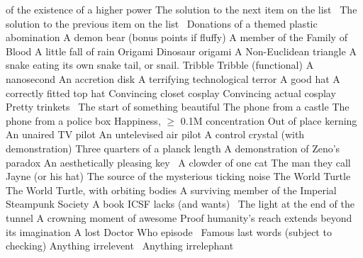 \begin{multicols}{2}
\begin{small}
\begin{tabbing}
{        of the existence of a higher power}
           {The solution to the next item on the list~\E}
          {The solution to the previous item on the list~\E}
          {Donations of a themed plastic abomination}
           {A demon bear (bonus points if fluffy)}
           {A member of the Family of Blood}
           {A little fall of rain}
           {Origami}
          {Dinosaur origami}
           {A Non-Euclidean triangle}
           {A snake eating its own snake tail, or snail.}
           {Tribble}
          {Tribble (functional)}
           {A nanosecond}
          {An accretion disk}
          {A terrifying technological terror}
           {A good hat}
           {A correctly fitted top hat}
           {Convincing closet cosplay}
          {Convincing actual cosplay}
          {Pretty trinkets~\FD}
           {The start of something beautiful}
          {The phone from a castle}
          {The phone from a police box}
          {Happiness, $\ge$ 0.1M concentration}
          {Out of place kerning}
          {An unaired TV pilot}
          {An untelevised air pilot}
          {A control crystal (with demonstration)}
          {Three quarters of a planck length}
          {A demonstration of Zeno's paradox}
          {An aesthetically pleasing key~\FD}
          {A clowder of one cat}
           {The man they call Jayne (or his hat)}
         {The source of the mysterious ticking noise}
         {The World Turtle}
         {The World Turtle, with orbiting bodies}
          {A surviving member of the Imperial Steampunk Society}
          {A book ICSF lacks (and wants)~\E}
           {The light at the end of the tunnel}
           {A crowning moment of awesome}
          {Proof humanity's reach extends beyond its imagination}
          {A lost Doctor Who episode~\E}
           {Famous last words (subject to checking)}
          {Anything irrelevent~\E}
          {Anything irrelephant~\E}

\end{tabbing}
\end{small}
\end{multicols}
